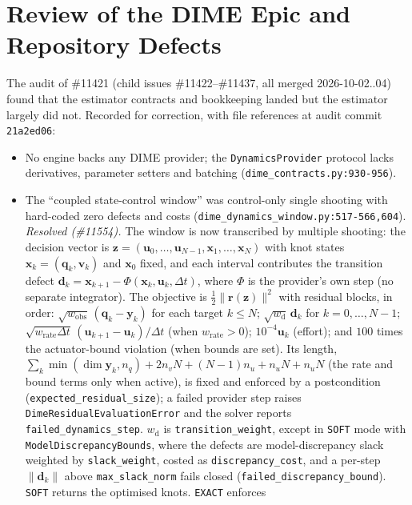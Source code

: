 \documentclass[11pt,a4paper]{article}
\newcommand{\bq}{\mathbf{q}}
\newcommand{\bv}{\mathbf{v}}
\newcommand{\bu}{\mathbf{u}}
\newcommand{\bx}{\mathbf{x}}
\newcommand{\by}{\mathbf{y}}
\begin{document}
\section{Review of the DIME Epic and Repository Defects}
\label{sec:dime_review}
The audit of \#11421 (child issues \#11422--\#11437, all merged 2026-10-02..04)
found that the estimator contracts and bookkeeping landed but the estimator
largely did not.  Recorded for correction, with file references at audit
commit \texttt{21a2ed06}:
\begin{itemize}[nosep]
  \item No engine backs any DIME provider; the \texttt{DynamicsProvider}
    protocol lacks derivatives, parameter setters and batching
    (\texttt{dime\_contracts.py:930-956}).
  \item The ``coupled state-control window'' was control-only single shooting
    with hard-coded zero defects and costs (\texttt{dime\_dynamics\_window.py:517-566,604}).
    \emph{Resolved (\#11554).}  The window is now transcribed by multiple
    shooting: the decision vector is
    $\mathbf{z}=(\bu_0,\dots,\bu_{N-1},\bx_1,\dots,\bx_N)$ with knot states
    $\bx_k=(\bq_k,\bv_k)$ and $\bx_0$ fixed, and each interval contributes the
    transition defect $\mathbf{d}_k=\bx_{k+1}-\Phi(\bx_k,\bu_k,\Delta t)$, where $\Phi$ is
    the provider's own step (no separate integrator).  The objective is
    $\tfrac12\lVert\mathbf{r}(\mathbf{z})\rVert^2$ with residual blocks, in order:
    $\sqrt{w_{\mathrm{obs}}}\,(\bq_k-\by_k)$ for each target $k\le N$;
    $\sqrt{w_{\mathrm{d}}}\,\mathbf{d}_k$ for $k=0,\dots,N-1$; $\sqrt{w_{\mathrm{rate}}\Delta t}\,(\bu_{k+1}-\bu_k)/\Delta t$
    (when $w_{\mathrm{rate}}>0$); $10^{-4}\bu_k$ (effort); and $100$ times the
    actuator-bound violation (when bounds are set).  Its length,
    $\sum_k\min(\dim\by_k,n_q)+2n_vN+(N-1)n_u+n_uN+n_uN$ (the rate and bound
    terms only when active), is fixed and enforced by a postcondition
    (\texttt{expected\_residual\_size}); a failed provider step raises
    \texttt{DimeResidualEvaluationError} and the solver reports
    \texttt{failed\_dynamics\_step}.  $w_{\mathrm{d}}$ is \texttt{transition\_weight},
    except in \texttt{SOFT} mode with \texttt{ModelDiscrepancyBounds}, where the
    defects are model-discrepancy slack weighted by \texttt{slack\_weight}, costed
    as \texttt{discrepancy\_cost}, and a per-step $\lVert\mathbf{d}_k\rVert$ above
    \texttt{max\_slack\_norm} fails closed (\texttt{failed\_discrepancy\_bound}).
    \texttt{SOFT} returns the optimised knots.  \texttt{EXACT} enforces

\end{itemize}
\end{document}
